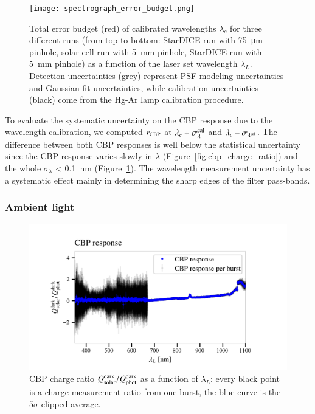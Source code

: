 \begin{figure}[!h]
\centering
\texttt{[image: spectrograph\_error\_budget.png]}
\caption{Total error budget (red) of calibrated wavelengths $\lambda_c$ for three different runs (from top to bottom: StarDICE run with \SI{75}{\um} pinhole, solar cell run with \SI{5}{mm} pinhole, StarDICE run with \SI{5}{mm} pinhole) as a function of the laser set wavelength $\lambda_L$. Detection uncertainties (grey) represent PSF modeling uncertainties and Gaussian fit uncertainties, while calibration uncertainties (black) come from the Hg-Ar lamp calibration procedure. }\label{fig:wavelength_error_budget}
\end{figure}

To evaluate the systematic uncertainty on the CBP response due to the wavelength calibration, we computed $r_{\rm CBP}$ at $\lambda_c+\sigma_{\lambda}^{\rm cal}$ and $\lambda_c-\sigma_{\lambda^{\rm cal}}$. The difference between both CBP responses is well below the statistical uncertainty since the CBP response varies slowly in $\lambda$ (Figure~\ref{fig:cbp_charge_ratio}) and the whole $\sigma_\lambda$ < \SI{0.1}{\nano\meter} (Figure~\ref{fig:wavelength_error_budget}). The wavelength measurement uncertainty has a systematic effect mainly in determining the sharp edges of the filter pass-bands.



\subsubsection{Ambient light}\label{sec:sc_linearity}

\begin{figure}[h]
    \centering
    \includegraphics[width=\columnwidth]{fig/sc_dark_qswMAX.png}
    \caption{CBP charge ratio $Q_{\mathrm{solar}}^{\rm dark}/Q_{\mathrm{phot}}^{\rm dark}$ as a function of $\lambda_L$: every black point is a charge measurement ratio from one burst, the blue curve is the $5\sigma$-clipped average.}
    \label{fig:sc_dark}
\end{figure}

